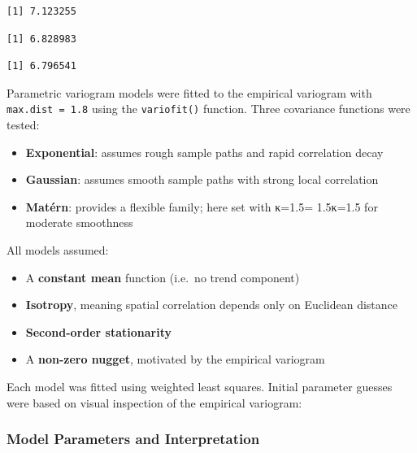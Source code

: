 \documentclass[
  11pt,
]{article}
\begin{document}
\begin{verbatim}
[1] 7.123255
\end{verbatim}

\begin{verbatim}
[1] 6.828983
\end{verbatim}

\begin{verbatim}
[1] 6.796541
\end{verbatim}

Parametric variogram models were fitted to the empirical variogram with
\texttt{max.dist\ =\ 1.8} using the \texttt{variofit()} function. Three
covariance functions were tested:

\begin{itemize}
\item
  \textbf{Exponential}: assumes rough sample paths and rapid correlation
  decay
\item
  \textbf{Gaussian}: assumes smooth sample paths with strong local
  correlation
\item
  \textbf{Matérn}: provides a flexible family; here set with
  κ=1.5\kappa = 1.5κ=1.5 for moderate smoothness
\end{itemize}

All models assumed:

\begin{itemize}
\item
  A \textbf{constant mean} function (i.e.~no trend component)
\item
  \textbf{Isotropy}, meaning spatial correlation depends only on
  Euclidean distance
\item
  \textbf{Second-order stationarity}
\item
  A \textbf{non-zero nugget}, motivated by the empirical variogram
\end{itemize}

Each model was fitted using weighted least squares. Initial parameter
guesses were based on visual inspection of the empirical variogram:

\subsubsection{\texorpdfstring{\textbf{Model Parameters and
Interpretation}}{Model Parameters and Interpretation}}\label{model-parameters-and-interpretation}
\end{document}
